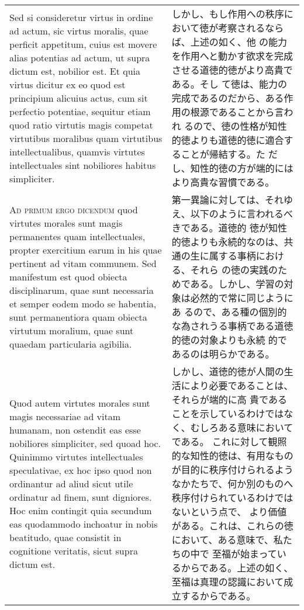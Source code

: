 \documentclass[10pt]{jsarticle}
\begin{document}
\begin{longtable}{p{21em}p{21em}}
\\

 Sed si consideretur virtus in ordine ad actum, sic virtus moralis,
quae perficit appetitum, cuius est movere alias potentias ad actum, ut
supra dictum est, nobilior est. Et quia virtus dicitur ex eo quod est
principium alicuius actus, cum sit perfectio potentiae, sequitur etiam
quod ratio virtutis magis competat virtutibus moralibus quam
virtutibus intellectualibus, quamvis virtutes intellectuales sint
nobiliores habitus simpliciter.

&

 しかし、もし作用への秩序において徳が考察されるならば、上述の如く、他
 の能力を作用へと動かす欲求を完成させる道徳的徳がより高貴である。そし
 て徳は、能力の完成であるのだから、ある作用の根源であることから言われ
 るので、徳の性格が知性的徳よりも道徳的徳に適合することが帰結する。た
 だし、知性的徳の方が端的にはより高貴な習慣である。

\\

 {\scshape Ad primum ergo dicendum} quod virtutes morales sunt magis
 permanentes quam intellectuales, propter exercitium earum in his quae
 pertinent ad vitam communem. Sed manifestum est quod obiecta
 disciplinarum, quae sunt necessaria et semper eodem modo se habentia,
 sunt permanentiora quam obiecta virtutum moralium, quae sunt quaedam
 particularia agibilia.

&

 第一異論に対しては、それゆえ、以下のように言われるべきである。道徳的
 徳が知性的徳よりも永続的なのは、共通の生に属する事柄における、それら
 の徳の実践のためである。しかし、学習の対象は必然的で常に同じようにあ
 るので、ある種の個別的な為されうる事柄である道徳的徳の対象よりも永続
 的であるのは明らかである。
 

\\

 Quod autem virtutes morales sunt magis necessariae ad vitam humanam,
 non ostendit eas esse nobiliores simpliciter, sed quoad hoc. Quinimmo
 virtutes intellectuales speculativae, ex hoc ipso quod non ordinantur
 ad aliud sicut utile ordinatur ad finem, sunt digniores. Hoc enim
 contingit quia secundum eas quodammodo inchoatur in nobis beatitudo,
 quae consistit in cognitione veritatis, sicut supra dictum est.


&

 しかし、道徳的徳が人間の生活により必要であることは、それらが端的に高
 貴であることを示しているわけではなく、むしろある意味においてである。
 これに対して観照的な知性的徳は、有用なものが目的に秩序付けられるよう
 なかたちで、何か別のものへ秩序付けられているわけではないという点で、
 より価値がある。これは、これらの徳において、ある意味で、私たちの中で
 至福が始まっているからである。上述の如く、至福は真理の認識において成
 立するからである。


\end{longtable}
\end{document}
